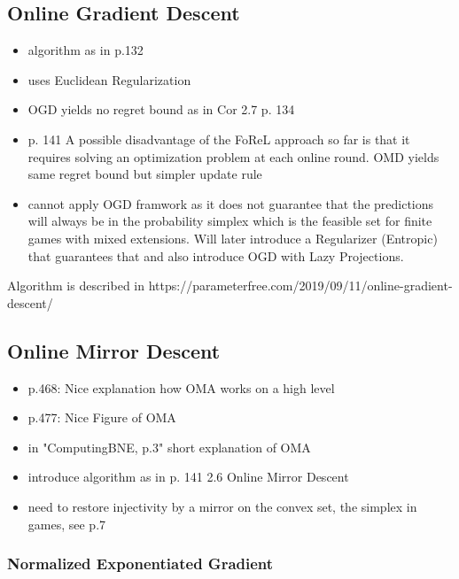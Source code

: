 \subsection{Online Gradient Descent}\label{subsection:onlineGradientAscent}

\begin{itemize}
    \item algorithm as in \cite{shalev} p.132
    \item uses Euclidean Regularization
    \item OGD yields no regret bound as in Cor 2.7 p. 134
    \item \cite{shalev} p. 141 A possible disadvantage of the FoReL approach so far is that it requires solving an optimization problem at each online round. OMD yields same regret bound but simpler update rule
    \item cannot apply OGD framwork as it does not guarantee that the predictions
    will always be in the probability simplex which is the feasible set for 
    finite games with mixed extensions. Will later introduce a Regularizer
    (Entropic) that guarantees that and also introduce OGD with Lazy Projections.
\end{itemize}
Algorithm is described in https://parameterfree.com/2019/09/11/online-gradient-descent/ 

\subsection{Online Mirror Descent}\label{subsection:onlineMirrorAscent}

\begin{itemize}
    \item \cite{mertikopoulos} p.468: Nice explanation how OMA works on a high level
    \item \cite{mertikopoulos} p.477: Nice Figure of OMA 
    \item in "ComputingBNE, p.3" short explanation of OMA 
    \item introduce algorithm as in \cite{shalev} p. 141 2.6 Online Mirror Descent
    \item need to restore injectivity by a mirror on the convex set, the simplex in games, see \cite{flokas} p.7
\end{itemize}

\subsubsection{Normalized Exponentiated Gradient}\label{subsubsection:normalizedExponentiatedGradient}

